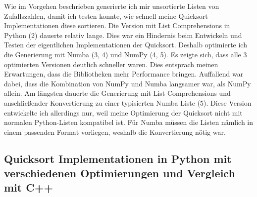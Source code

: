 \documentclass[11pt,a4paper]{article}
\begin{document}
Wie im Vorgehen beschrieben generierte ich mir unsortierte Listen von Zufallszahlen,
damit ich testen konnte, wie schnell meine Quicksort Implementationen diese
sortieren. Die Version mit List Comprehensions in Python (2) dauerte relativ lange.
Dies war ein Hindernis beim Entwickeln und Testen der eigentlichen Implementationen der
Quicksort. Deshalb optimierte ich die Generierung mit Numba (3, 4) und NumPy (4, 5).
Es zeigte sich, dass alle 3 optimierten Versionen deutlich schneller waren.
Dies entsprach meinen Erwartungen, dass die Bibliotheken mehr Performance bringen.
Auffallend war dabei, dass die Kombination von NumPy und Numba langsamer war,
als NumPy allein.
Am längsten dauerte die Generierung mit List Comprehensions und anschließender
Konvertierung zu einer typisierten Numba Liste (5). Diese Version entwickelte
ich allerdings nur, weil meine Optimierung der Quicksort nicht mit normalen Python-Listen
kompatibel ist. Für Numba müssen die Listen nämlich in einem passenden Format vorliegen,
weshalb die Konvertierung nötig war.

\subsection{Quicksort Implementationen in Python mit verschiedenen Optimierungen und Vergleich mit C++}

\begin{bchart}[min=0, max=80, scale=1.9]
    \smallskip
    \smallskip
    \smallskip
    \smallskip
    \smallskip
    \smallskip
    \smallskip
    \smallskip
    \smallskip
    \smallskip
    \smallskip
    \smallskip
\end{bchart}
\end{document}
